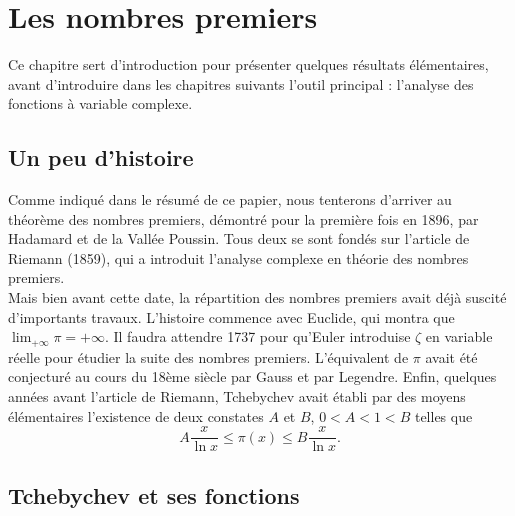 \documentclass[french]{report}
\begin{document}
\chapter{Les nombres premiers}

Ce chapitre sert d'introduction pour présenter quelques résultats élémentaires, avant d'introduire dans les chapitres suivants l'outil principal : l'analyse des fonctions à variable complexe.

\section{Un peu d'histoire}

Comme indiqué dans le résumé de ce papier, nous tenterons d'arriver au théorème des nombres premiers, démontré pour la première fois en 1896, par Hadamard et de la Vallée Poussin. Tous deux se sont fondés sur l'article \cite{riemann} de Riemann (1859), qui a introduit l'analyse complexe en théorie des nombres premiers.
\\

Mais bien avant cette date, la répartition des nombres premiers avait déjà suscité d'importants travaux. L'histoire commence avec Euclide, qui montra que $\lim_{+\infty}\pi=+\infty$. Il faudra attendre 1737 pour qu'Euler introduise $\zeta$ en variable réelle pour étudier la suite des nombres premiers. L'équivalent de $\pi$ avait été conjecturé au cours du 18ème siècle par Gauss et par Legendre. Enfin, quelques années avant l'article de Riemann, Tchebychev avait établi par des moyens élémentaires l'existence de deux constates $A$ et $B$, $0<A<1<B$ telles que
\[
  A\frac{x}{\ln x}\leq\pi(x)\leq B\frac{x}{\ln x}.
\]

\section{Tchebychev et ses fonctions}
\end{document}
